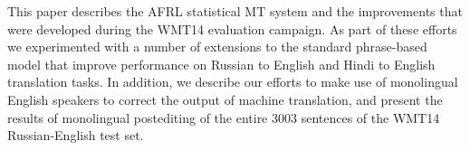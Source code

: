 This paper describes the AFRL statistical MT system and the improvements that were developed during the WMT14 evaluation campaign. As part of these efforts we experimented with a number of extensions to the standard phrase-based model that improve performance on Russian to English and Hindi to English translation tasks. In addition, we describe our efforts to make use of monolingual English speakers to correct the output of machine translation, and present the results of monolingual postediting of the entire 3003 sentences of the WMT14 Russian-English test set.
